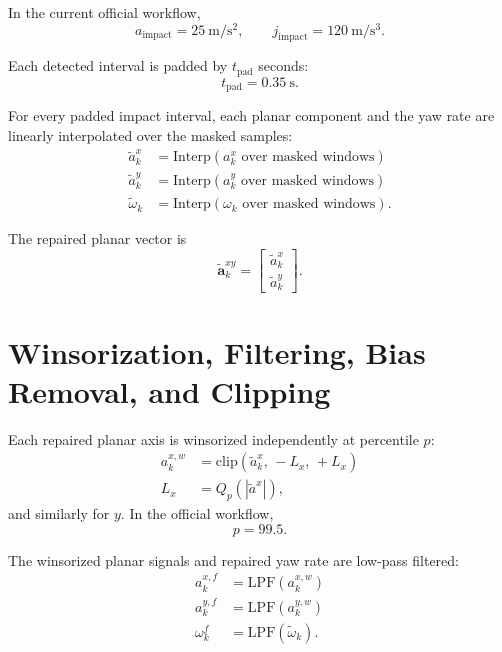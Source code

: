 \documentclass[11pt]{article}
\begin{document}
In the current official workflow,
\begin{equation}
a_{\mathrm{impact}} = 25 \ \mathrm{m/s^2},
\qquad
j_{\mathrm{impact}} = 120 \ \mathrm{m/s^3}.
\end{equation}

Each detected interval is padded by \(t_{\mathrm{pad}}\) seconds:
\begin{equation}
t_{\mathrm{pad}} = 0.35 \ \mathrm{s}.
\end{equation}

For every padded impact interval, each planar component and the yaw rate are linearly interpolated over the masked samples:
\begin{align}
\tilde{a}^x_k &= \mathrm{Interp}(a^x_k \text{ over masked windows}) \\
\tilde{a}^y_k &= \mathrm{Interp}(a^y_k \text{ over masked windows}) \\
\tilde{\omega}_k &= \mathrm{Interp}(\omega_k \text{ over masked windows}).
\end{align}

The repaired planar vector is
\begin{equation}
\tilde{\bm{a}}^{xy}_k =
\begin{bmatrix}
\tilde{a}^x_k \\
\tilde{a}^y_k
\end{bmatrix}.
\end{equation}

\section{Winsorization, Filtering, Bias Removal, and Clipping}
Each repaired planar axis is winsorized independently at percentile \(p\):
\begin{align}
a^{x,w}_k &= \mathrm{clip}(\tilde{a}^x_k,\,-L_x,\,+L_x) \\
L_x &= Q_p(|\tilde{a}^x|),
\end{align}
and similarly for \(y\). In the official workflow,
\begin{equation}
p = 99.5.
\end{equation}

The winsorized planar signals and repaired yaw rate are low-pass filtered:
\begin{align}
a^{x,f}_k &= \mathrm{LPF}(a^{x,w}_k) \\
a^{y,f}_k &= \mathrm{LPF}(a^{y,w}_k) \\
\omega^f_k &= \mathrm{LPF}(\tilde{\omega}_k).
\end{align}
\end{document}
